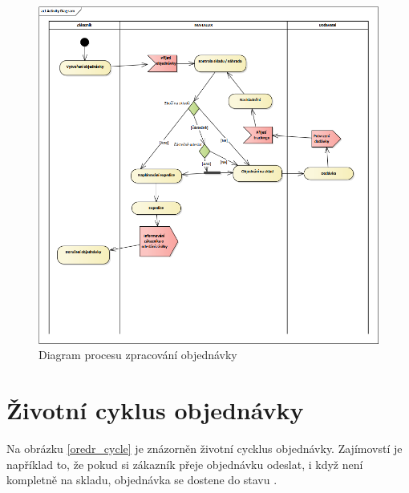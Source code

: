 \documentclass[thesis=B,czech]{FITthesis}[2012/06/26]
\begin{document}
\begin{figure}
	\includegraphics[width=\textwidth]{order_activity.png}
	\caption{Diagram procesu zpracování objednávky}\label{order_activity}
\end{figure}

\section{Životní cyklus objednávky}
	Na obrázku \ref{oredr_cycle} je znázorněn životní cycklus objednávky. Zajímovstí je například to, že pokud si zákazník přeje objednávku odeslat, i když není kompletně na skladu, objednávka se dostene do stavu . 
	
\end{document}
